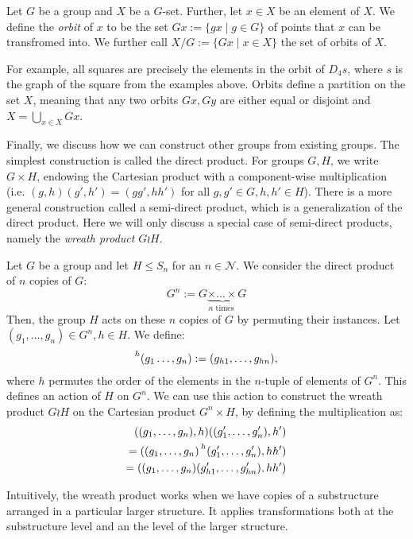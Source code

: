 \begin{defn}
Let $G$ be a group and $X$ be a $G$-set. Further, let $x \in X$ be an element of $X$. 
We define the \emph{orbit} of $x$ to be the set $Gx := \{ gx \mid g \in G\}$ of points that $x$ can be transfromed into.
We further call $X / G := \{ Gx \mid x \in X \}$ the set of orbits of $X$.
\end{defn}

For example, all squares are precisely the elements in the orbit of $D_4 s$, where $s$ is the graph of the square from the examples above.
Orbits define a partition on the set $X$, meaning that any two orbits $Gx, Gy$ are either equal or disjoint and $X = \bigcup_{x \in X} Gx$.

Finally, we discuss how we can construct other groups from existing groups.
The simplest construction is called the direct product.
For groups $G,H$, we write $G \times H$, endowing the Cartesian product with a component-wise multiplication (i.e. $(g,h)(g',h') = (gg',hh')$ for all $g,g' \in G, h,h' \in H$).
There is a more general construction called a semi-direct product, which is a generalization of the direct product. 
Here we will only discuss a special case of semi-direct products, namely the \emph{wreath product} $G \wr H$.

Let $G$ be a group and let $H \leq S_n$ for an $n \in \mathcal{N}$.
We consider the direct product of $n$ copies of $G$: 
\[ G^n := G \underbrace{\times \ldots \times}_{n \text{ times }} G \]
Then, the group $H$ acts on these $n$ copies of $G$ by permuting their instances. Let $(g_1,\ldots,g_n) \in G^n, h \in H$. We define: 
\[ \prescript{h}{} (g_1 \ldots, g_n) := (g_{h1},\ldots,g_{hn}), \] 
where $h$ permutes the order of the elements in the $n$-tuple of elements of $G^n$.
This defines an action of $H$ on $G^n$.
We can use this action to construct the wreath product $G \wr H$ on the Cartesian product $G^n \times H$, by defining the multiplication as:
\begin{align*} ((g_1,\ldots,g_n),h)((g'_1,\ldots,g'_n),h') \\
  = ((g_1,\ldots,g_n) \prescript{h}{}(g'_1,\ldots,g'_n),hh') \\
  = ((g_1,\ldots,g_n) (g'_{h1},\ldots,g'_{hn}),hh') \end{align*}

Intuitively, the wreath product works when we have copies of a substructure arranged in a particular larger structure.
It applies transformations both at the substructure level and an the level of the larger structure. 